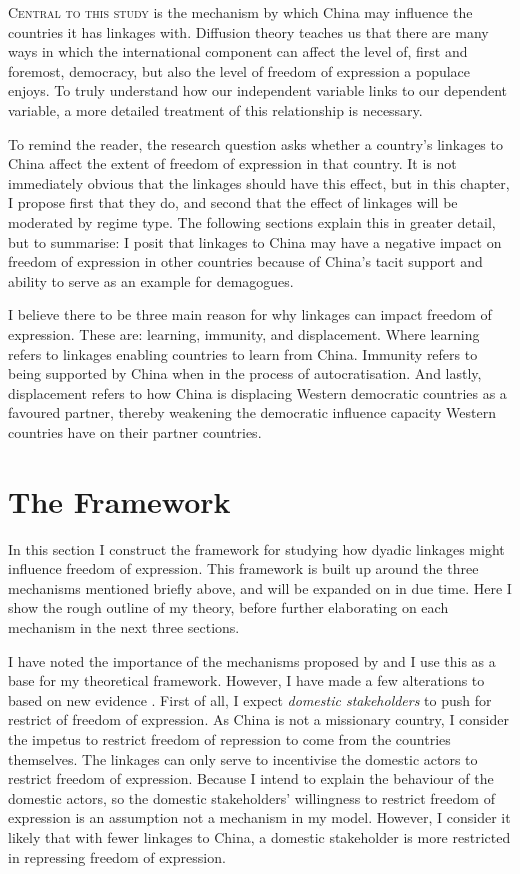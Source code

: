 \lettrine{C}{entral to this study} is the mechanism by which China may influence the countries it has linkages with. Diffusion theory teaches us that there are many ways in which the international component can affect the level of, first and foremost, democracy, but also the level of freedom of expression a populace enjoys. To truly understand how our independent variable links to our dependent variable, a more detailed treatment of this relationship is necessary.

To remind the reader, the research question asks whether a country's linkages to China affect the extent of freedom of expression in that country. It is not immediately obvious that the linkages should have this effect, but in this chapter, I propose first that they do, and second that the effect of linkages will be moderated by regime type. The following sections explain this in greater detail, but to summarise: I posit that linkages to China may have a negative impact on freedom of expression in other countries because of China's tacit support and ability to serve as an example for demagogues. 

I believe there to be three main reason for why linkages can impact freedom of expression. These are: learning, immunity, and displacement. Where learning refers to linkages enabling countries to learn from China. Immunity refers to being supported by China when in the process of autocratisation. And lastly, displacement refers to how China is displacing Western democratic countries as a favoured partner, thereby weakening the democratic influence capacity Western countries have on their partner countries.

\section{The Framework}
In this section I construct the framework for studying how dyadic linkages might influence freedom of expression. This framework is built up around the three mechanisms mentioned briefly above, and will be expanded on in due time. Here I show the rough outline of my theory, before further elaborating on each mechanism in the next three sections. 

I have noted the importance of the mechanisms proposed by \citet{tansey_ties_2017} and I use this as a base for my theoretical framework. However, I have made a few alterations to based on new evidence \citep{weyland_autocratic_2017}. First of all, I expect \textit{domestic stakeholders} to push for restrict of freedom of expression. As China is not a missionary country, I consider the impetus to restrict freedom of repression to come from the countries themselves. The linkages can only serve to incentivise the domestic actors to restrict freedom of expression. Because I intend to explain the behaviour of the domestic actors, so the domestic stakeholders' willingness to restrict freedom of expression is an assumption not a mechanism in my model. However, I consider it likely that with fewer linkages to China, a domestic stakeholder is more restricted in repressing freedom of expression.

